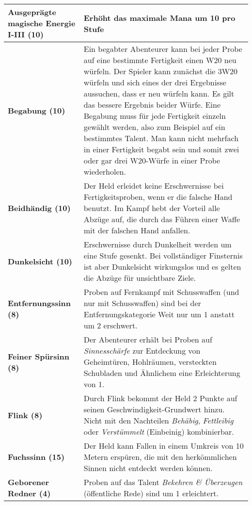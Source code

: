 \begin{longtable}{|p{5cm}|p{11cm}|}
\textbf{Ausgeprägte magische Energie I-III (10)} & Erhöht das maximale Mana um 10 pro Stufe \\ \hline

\textbf{Begabung (10)} & Ein begabter Abenteurer kann bei jeder Probe auf eine bestimmte Fertigkeit einen W20 neu würfeln. Der Spieler kann zunächst die 3W20 würfeln und sich eines der drei Ergebnisse aussuchen, dass er neu würfeln kann. Es gilt das bessere Ergebnis beider Würfe. Eine Begabung muss für jede Fertigkeit einzeln gewählt werden, also zum Beispiel auf ein bestimmtes Talent. Man kann nicht mehrfach in einer Fertigkeit begabt sein und somit zwei oder gar drei W20-Würfe in einer Probe wiederholen. \\ \hline

\textbf{Beidhändig (10)} & Der Held erleidet keine Erschwernisse bei Fertigkeitsproben, wenn er die falsche Hand benutzt. Im Kampf hebt der Vorteil alle Abzüge auf, die durch das Führen einer Waffe mit der falschen Hand anfallen. \\ \hline

\textbf{Dunkelsicht (10)} & Erschwernisse durch Dunkelheit werden um eine Stufe gesenkt. Bei vollständiger Finsternis ist aber Dunkelsicht wirkungslos und es gelten die Abzüge für unsichtbare Ziele. \\ \hline

\textbf{Entfernungssinn (8)} & Proben auf Fernkampf mit Schusswaffen (und nur mit Schusswaffen) sind bei der Entfernungskategorie Weit nur um 1 anstatt um 2 erschwert. \\ \hline

\textbf{Feiner Spürsinn (8)} & Der Abenteurer erhält bei Proben auf \textit{Sinnesschärfe} zur Entdeckung von Geheimtüren, Hohlräumen, versteckten Schubladen und Ähnlichem eine Erleichterung von 1. \\ \hline

\textbf{Flink (8)} & Durch Flink bekommt der Held 2 Punkte auf seinen Geschwindigkeit-Grundwert hinzu. Nicht mit den Nachteilen \textit{Behäbig}, \textit{Fettleibig} oder \textit{Verstümmelt} (Einbeinig) kombinierbar. \\ \hline

\textbf{Fuchssinn (15)} & Der Held kann Fallen in einem Umkreis von 10 Metern erspüren, die mit den herkömmlichen Sinnen nicht entdeckt werden können. \\ \hline

\textbf{Geborener Redner (4)} & Proben auf das Talent \textit{Bekehren \& Überzeugen} (öffentliche Rede) sind um 1 erleichtert. \\ \hline


\end{longtable}
